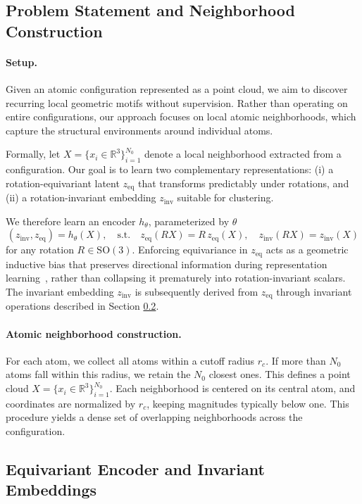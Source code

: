 \documentclass[runningheads]{llncs}
\begin{document}
\subsection{Problem Statement and Neighborhood Construction}

\paragraph{Setup.}
Given an atomic configuration represented as a point cloud, we aim to discover recurring local geometric motifs without supervision. Rather than operating on entire configurations, our approach focuses on local atomic neighborhoods, which capture the structural environments around individual atoms.

Formally, let $X=\{x_i \in \mathbb{R}^3\}_{i=1}^{N_0}$ denote a local neighborhood extracted from a configuration.
Our goal is to learn two complementary representations: (i) a rotation-equivariant latent $ z_{\text{eq}}$ that transforms predictably under rotations, and (ii) a rotation-invariant embedding $z_{\text{inv}}$ suitable for clustering.

We therefore learn an encoder $h_\theta$, parameterized by $\theta$
$$
(z_{\text{inv}}, z_{\text{eq}}) = h_\theta(X), \quad \text{s.t.} \quad z_{\text{eq}}(RX) = R \, z_{\text{eq}}(X), \quad
z_{\text{inv}}(RX) = z_{\text{inv}}(X)$$
for any rotation $R \in \text{SO}(3)$. Enforcing equivariance in $z_{\text{eq}}$ acts as a geometric inductive bias that preserves directional information during representation learning~\cite{wang2024ssl}, rather than collapsing it prematurely into rotation-invariant scalars. The invariant embedding $z_{\text{inv}}$ is subsequently derived from $z_{\text{eq}}$ through invariant operations described in Section \ref{subsec:encoder}.

\paragraph{Atomic neighborhood construction.}
For each atom, we collect all atoms within a cutoff radius $r_c$. If more than $N_0$ atoms fall within this radius, we retain the $N_0$ closest ones. This defines a point cloud $X=\{x_i\in\mathbb{R}^3\}_{i=1}^{N_0}$.
Each neighborhood is centered on its central atom, and coordinates are normalized by $r_c$, keeping magnitudes typically below one.
This procedure yields a dense set of overlapping neighborhoods across the configuration.

\subsection{Equivariant Encoder and Invariant Embeddings}
\label{subsec:encoder}
\end{document}
